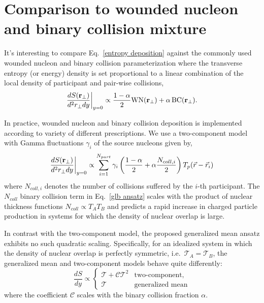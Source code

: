 \documentclass[aps,prl,reprint,amsmath,nofootinbib]{revtex4-1}
\begin{document}
\section{Comparison to wounded nucleon and binary collision mixture}

It's interesting to compare Eq.~\eqref{entropy deposition} against the commonly used wounded nucleon and
binary collision parameterization where the transverse entropy (or energy) density is set proportional to a
linear combination of the local density of participant and pair-wise collisions,
\begin{equation}
  \label{glb ansatz}
  \frac{dS({\bf r}_\perp)}{d^2r_\perp dy} \biggr \rvert_{y=0} \propto
  \frac{1-\alpha}{2}\mbox{WN}({\bf r_\perp}) + \alpha\, \mbox{BC}({\bf r_\perp}).
\end{equation}

In practice, wounded nucleon and binary collision deposition is implemented according to variety of different
prescriptions. We use a two-component model with Gamma fluctuations $\gamma_i$ of the source nucleons given
by,
\begin{equation}
  \label{glb algorithm}
  \frac{dS({\bf r}_\perp)}{d^2r_\perp dy} \biggr \rvert_{y=0} \propto
  \sum\limits_{i=1}^{N_{part}} \gamma_i \left(\frac{1-\alpha}{2} +
  \alpha \frac{N_{coll,i}}{2} \right ) T_p(\vec{r}-\vec{r}_i)
\end{equation}
where $N_{coll,i}$ denotes the number of collisions suffered by the $i$-th participant. The $N_{coll}$ binary
collision term in Eq.~\eqref{glb ansatz} scales with the product of nuclear thickness functions $N_{coll}
\propto T_A T_B$ and predicts a rapid increase in charged particle production in systems for which the density
of nuclear overlap is large.

In contrast with the two-component model, the proposed generalized mean ansatz exhibits no such quadratic
scaling. Specifically, for an idealized system in which the density of nuclear overlap is perfectly symmetric,
i.e.\ $\mathcal{T}_A = \mathcal{T}_B$, the generalized mean and two-component models behave quite differently:
\begin{equation}
  \label{symmetric scaling}
  \frac{dS}{dy} \propto
  \begin{cases}
    \mathcal{T} + \mathcal{C} \mathcal{T}^2 & \text{two-component,} \\
    \mathcal{T} & \text{generalized mean}
  \end{cases}
\end{equation}
where the coefficient $\mathcal{C}$ scales with the binary collision fraction $\alpha$.
\end{document}
